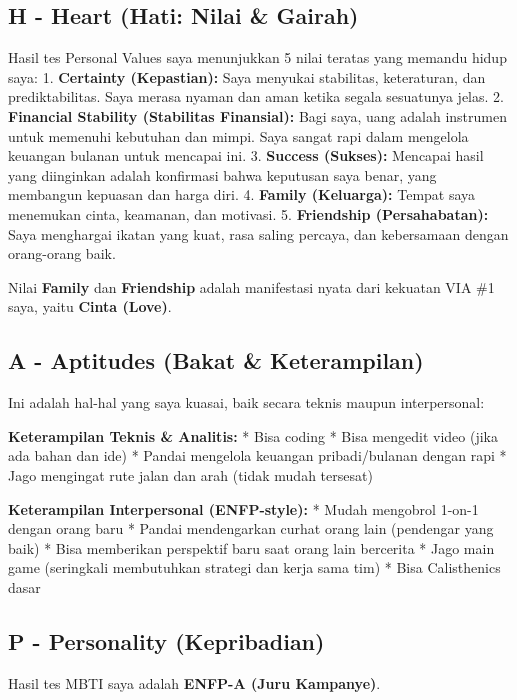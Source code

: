 \documentclass[
  letterpaper,
  DIV=11,
  numbers=noendperiod]{scrreprt}
\begin{document}
\subsection{H - Heart (Hati: Nilai \&
Gairah)}\label{h---heart-hati-nilai-gairah}

Hasil tes Personal Values saya menunjukkan 5 nilai teratas yang memandu
hidup saya: 1. \textbf{Certainty (Kepastian):} Saya menyukai stabilitas,
keteraturan, dan prediktabilitas. Saya merasa nyaman dan aman ketika
segala sesuatunya jelas. 2. \textbf{Financial Stability (Stabilitas
Finansial):} Bagi saya, uang adalah instrumen untuk memenuhi kebutuhan
dan mimpi. Saya sangat rapi dalam mengelola keuangan bulanan untuk
mencapai ini. 3. \textbf{Success (Sukses):} Mencapai hasil yang
diinginkan adalah konfirmasi bahwa keputusan saya benar, yang membangun
kepuasan dan harga diri. 4. \textbf{Family (Keluarga):} Tempat saya
menemukan cinta, keamanan, dan motivasi. 5. \textbf{Friendship
(Persahabatan):} Saya menghargai ikatan yang kuat, rasa saling percaya,
dan kebersamaan dengan orang-orang baik.

Nilai \textbf{Family} dan \textbf{Friendship} adalah manifestasi nyata
dari kekuatan VIA \#1 saya, yaitu \textbf{Cinta (Love)}.

\subsection{A - Aptitudes (Bakat \&
Keterampilan)}\label{a---aptitudes-bakat-keterampilan}

Ini adalah hal-hal yang saya kuasai, baik secara teknis maupun
interpersonal:

\textbf{Keterampilan Teknis \& Analitis:} * Bisa coding * Bisa mengedit
video (jika ada bahan dan ide) * Pandai mengelola keuangan
pribadi/bulanan dengan rapi * Jago mengingat rute jalan dan arah (tidak
mudah tersesat)

\textbf{Keterampilan Interpersonal (ENFP-style):} * Mudah mengobrol
1-on-1 dengan orang baru * Pandai mendengarkan curhat orang lain
(pendengar yang baik) * Bisa memberikan perspektif baru saat orang lain
bercerita * Jago main game (seringkali membutuhkan strategi dan kerja
sama tim) * Bisa Calisthenics dasar

\subsection{P - Personality
(Kepribadian)}\label{p---personality-kepribadian}

Hasil tes MBTI saya adalah \textbf{ENFP-A (Juru Kampanye)}.
\end{document}
